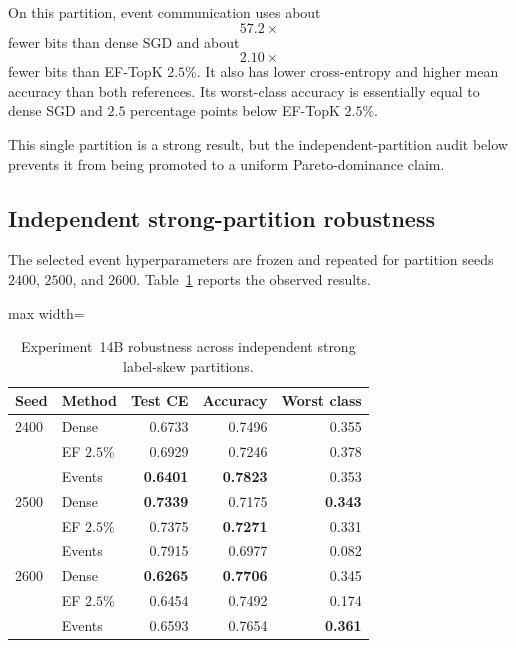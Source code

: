 On this partition, event communication uses about
\begin{equation}
57.2\times
\end{equation}
fewer bits than dense SGD and about
\begin{equation}
2.10\times
\end{equation}
fewer bits than EF-TopK $2.5\%$. It also has lower cross-entropy and higher mean accuracy than both references. Its worst-class accuracy is essentially equal to dense SGD and $2.5$ percentage points below EF-TopK $2.5\%$.

This single partition is a strong result, but the independent-partition audit below prevents it from being promoted to a uniform Pareto-dominance claim.

\subsection{Independent strong-partition robustness}

The selected event hyperparameters are frozen and repeated for partition seeds $2400$, $2500$, and $2600$. Table~\ref{tab:exp14b-seeds} reports the observed results.

\begin{table}[t]
\centering
\caption{Experiment~14B robustness across independent strong label-skew partitions.}
\label{tab:exp14b-seeds}
\begin{adjustbox}{max width=\textwidth}
\begin{tabular}{llrrr}
\toprule
Seed & Method & Test CE & Accuracy & Worst class\\
\midrule
2400 & Dense & 0.6733 & 0.7496 & 0.355\\
     & EF $2.5\%$ & 0.6929 & 0.7246 & 0.378\\
     & Events & \textbf{0.6401} & \textbf{0.7823} & 0.353\\
\midrule
2500 & Dense & \textbf{0.7339} & 0.7175 & \textbf{0.343}\\
     & EF $2.5\%$ & 0.7375 & \textbf{0.7271} & 0.331\\
     & Events & 0.7915 & 0.6977 & 0.082\\
\midrule
2600 & Dense & \textbf{0.6265} & \textbf{0.7706} & 0.345\\
     & EF $2.5\%$ & 0.6454 & 0.7492 & 0.174\\
     & Events & 0.6593 & 0.7654 & \textbf{0.361}\\
\bottomrule
\end{tabular}
\end{adjustbox}
\end{table}

